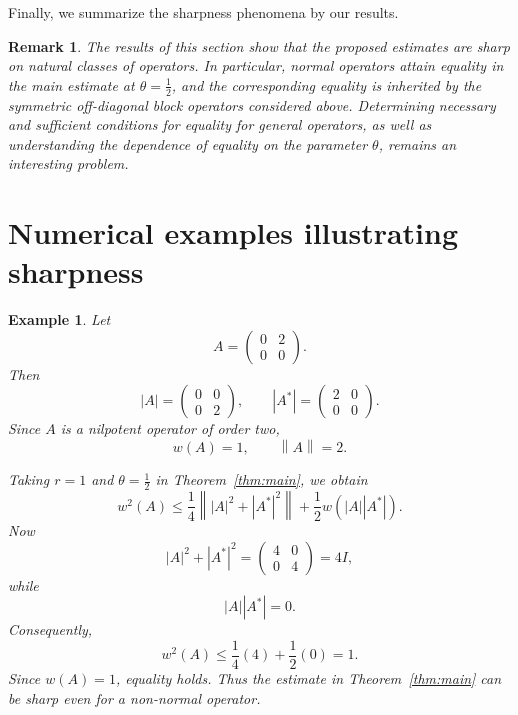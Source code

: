 \documentclass[final,1p,times]{elsarticle}
\newtheorem{rem}[thm]{Remark}
\newtheorem{example}[thm]{Example}
\newcommand{\norm}[1]{\left\lVert #1 \right\rVert}
\begin{document}
\medskip

Finally, we summarize the sharpness phenomena by our results.

\begin{rem}
The results of this section show that the proposed estimates are sharp on
natural classes of operators. In particular, normal operators attain equality
in the main estimate at $\theta=\frac12$, and the corresponding equality is
inherited by the symmetric off-diagonal block operators considered above.
Determining necessary and sufficient conditions for equality for general
operators, as well as understanding the dependence of equality on the
parameter $\theta$, remains an interesting problem.
\end{rem}

\section{Numerical examples illustrating sharpness} 

\begin{example}
Let
\[
A=
\begin{pmatrix}
0&2\\
0&0
\end{pmatrix}.
\]
Then
\[
|A|=
\begin{pmatrix}
0&0\\
0&2
\end{pmatrix},
\qquad
|A^*|=
\begin{pmatrix}
2&0\\
0&0
\end{pmatrix}.
\]
Since $A$ is a nilpotent operator of order two,
\[
w(A)=1,
\qquad
\norm{A}=2.
\]

Taking $r=1$ and $\theta=\frac12$ in
Theorem~\ref{thm:main}, we obtain
\[
w^2(A)
\leq
\frac14\norm{|A|^2+|A^*|^2}
+
\frac12 w(|A||A^*|).
\]
Now
\[
|A|^2+|A^*|^2
=
\begin{pmatrix}
4&0\\
0&4
\end{pmatrix}
=4I,
\]
while
\[
|A||A^*|=0.
\]
Consequently,
\[
w^2(A)
\leq
\frac14(4)
+
\frac12(0)
=1.
\]
Since $w(A)=1$, equality holds. Thus the estimate in
Theorem~\ref{thm:main} can be sharp even for a non-normal operator.
\end{example}



\medskip
\end{document}
